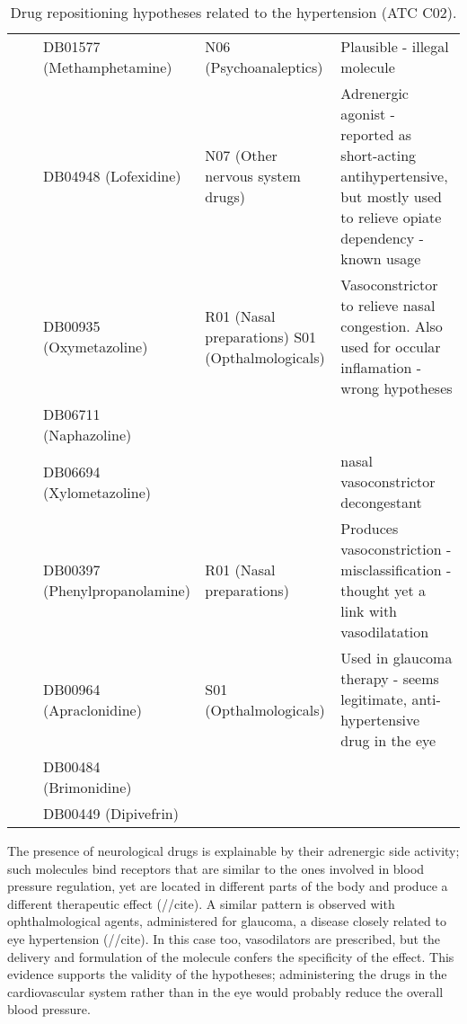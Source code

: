 \begin{table}[htbp]
\begin{tabular}{|p{2cm}|p{2cm}|p{2cm}|p{2cm}|p{2cm}|}
\multicolumn{ 1}{|p{2cm}|}{} & \multicolumn{ 1}{p{2cm}|}{} & DB01577 (Methamphetamine) & N06 (Psychoanaleptics) & Plausible - illegal molecule \\ \cline{ 3- 5}
\multicolumn{ 1}{|p{2cm}|}{} & \multicolumn{ 1}{p{2cm}|}{} & DB04948 (Lofexidine) & N07 (Other nervous system drugs) & Adrenergic agonist - reported as short-acting antihypertensive, but mostly used to relieve opiate dependency - known usage \\ \cline{ 3- 5}
\multicolumn{ 1}{|p{2cm}|}{} & \multicolumn{ 1}{p{2cm}|}{} & DB00935 (Oxymetazoline) & \multicolumn{ 1}{p{2cm}|}{R01 (Nasal preparations)
S01 (Opthalmologicals)} & \multicolumn{ 1}{p{2cm}|}{Vasoconstrictor to relieve nasal congestion. Also used for occular inflamation - wrong hypotheses} \\ \cline{ 3- 3}
\multicolumn{ 1}{|p{2cm}|}{} & \multicolumn{ 1}{p{2cm}|}{} & DB06711 (Naphazoline) & \multicolumn{ 1}{p{2cm}|}{} & \multicolumn{ 1}{p{2cm}|}{} \\ \cline{ 3- 3}\cline{ 5- 5}
\multicolumn{ 1}{|p{2cm}|}{} & \multicolumn{ 1}{p{2cm}|}{} & DB06694 (Xylometazoline) & \multicolumn{ 1}{p{2cm}|}{} & nasal vasoconstrictor decongestant \\ \cline{ 3- 5}
\multicolumn{ 1}{|p{2cm}|}{} & \multicolumn{ 1}{p{2cm}|}{} & DB00397 (Phenylpropanolamine) & R01 (Nasal preparations) & Produces vasoconstriction - misclassification - thought yet a link with vasodilatation \\ \cline{ 3- 5}
\multicolumn{ 1}{|p{2cm}|}{} & \multicolumn{ 1}{p{2cm}|}{} & DB00964 (Apraclonidine) & \multicolumn{ 1}{p{2cm}|}{S01 (Opthalmologicals)} & \multicolumn{ 1}{p{2cm}|}{Used in glaucoma therapy - seems legitimate, anti-hypertensive drug in the eye} \\ \cline{ 3- 3}
\multicolumn{ 1}{|p{2cm}|}{} & \multicolumn{ 1}{p{2cm}|}{} & DB00484 (Brimonidine) & \multicolumn{ 1}{p{2cm}|}{} & \multicolumn{ 1}{p{2cm}|}{} \\ \cline{ 3- 3}
\multicolumn{ 1}{|p{2cm}|}{} & \multicolumn{ 1}{p{2cm}|}{} & DB00449 (Dipivefrin) & \multicolumn{ 1}{p{2cm}|}{} & \multicolumn{ 1}{p{2cm}|}{} \\ \hline
\end{tabular}
\label{tablel02}
\caption{Drug repositioning hypotheses related to the hypertension (ATC C02).}
\end{table}

The presence of neurological drugs is explainable by their adrenergic side activity; such molecules bind receptors that are similar to the ones involved in blood pressure regulation, yet are located in different parts of the body and produce a different therapeutic effect (//cite). A similar pattern is observed with ophthalmological agents, administered for glaucoma, a disease closely related to eye hypertension (//cite). In this case too, vasodilators are prescribed, but the delivery and formulation of the molecule confers the specificity of the effect. This evidence supports the validity of the hypotheses; administering the drugs in the cardiovascular system rather than in the eye would probably reduce the overall blood pressure.

